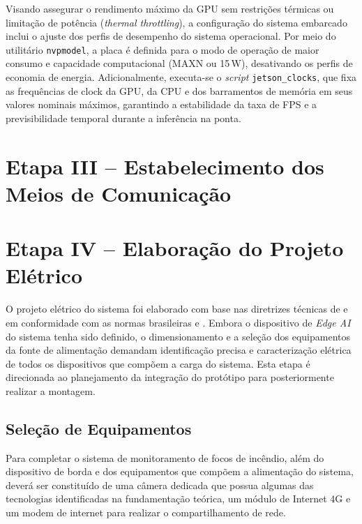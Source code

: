 Visando assegurar o rendimento máximo da GPU sem restrições térmicas ou limitação de potência (\textit{thermal throttling}), a configuração do sistema embarcado inclui o ajuste dos perfis de desempenho do sistema operacional. Por meio do utilitário \texttt{nvpmodel}, a placa é definida para o modo de operação de maior consumo e capacidade computacional (MAXN ou 15\,W), desativando os perfis de economia de energia. Adicionalmente, executa-se o \textit{script} \texttt{jetson\_clocks}, que fixa as frequências de clock da GPU, da CPU e dos barramentos de memória em seus valores nominais máximos, garantindo a estabilidade da taxa de FPS e a previsibilidade temporal durante a inferência na ponta.

\section{Etapa III -- Estabelecimento dos Meios de Comunicação}
\label{sec:etapa_iii}


\section{Etapa IV -- Elaboração do Projeto Elétrico}
\label{sec:etapa_iv}

O projeto elétrico do sistema foi elaborado com base nas diretrizes técnicas de
 e em conformidade com as normas brasileiras \cite{abnt2019nbr16690} e \cite{abnt2004nbr5410}. Embora o dispositivo de \textit{Edge AI} do sistema tenha sido definido, o dimensionamento e a seleção dos equipamentos da fonte de alimentação demandam identificação precisa e caracterização elétrica de todos os dispositivos que compõem a carga do sistema. Esta etapa é direcionada ao planejamento da integração do protótipo para posteriormente realizar a montagem.

\subsection{Seleção de Equipamentos}
\label{subsec:selecao_equipamentos}

Para completar o sistema de monitoramento de focos de incêndio, além do dispositivo de borda e dos equipamentos que compõem a alimentação do sistema, deverá ser constituído de uma câmera dedicada que possua algumas das tecnologias identificadas na fundamentação teórica, um módulo de Internet 4G e um modem de internet para realizar o compartilhamento de rede.

